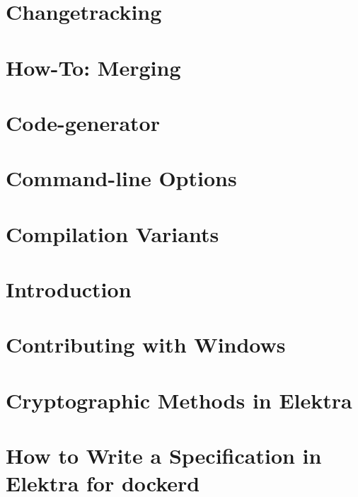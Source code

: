 \let\mypdfximage\pdfximage\def\pdfximage{\immediate\mypdfximage}\documentclass[twoside]{book}
\newcommand{\+}{\discretionary{\mbox{\scriptsize$\hookleftarrow$}}{}{}}
\begin{document}
\chapter{Changetracking}
\label{doc_tutorials_changetracking_md}

\chapter{How-\/\+To\+: Merging}
\label{doc_tutorials_cmerge_md}

\chapter{Code-\/generator}
\label{doc_tutorials_code-generator_md}

\chapter{Command-\/line Options}
\label{doc_tutorials_command-line-options_md}

\chapter{Compilation Variants}
\label{doc_tutorials_compilation-variants_md}

\chapter{Introduction}
\label{doc_tutorials_contributing-clion_md}

\chapter{Contributing with Windows}
\label{doc_tutorials_contributing-windows_md}

\chapter{Cryptographic Methods in Elektra}
\label{doc_tutorials_crypto_md}

\chapter{How to Write a Specification in Elektra for dockerd}
\label{doc_tutorials_dockerd-specification_md}

\end{document}
